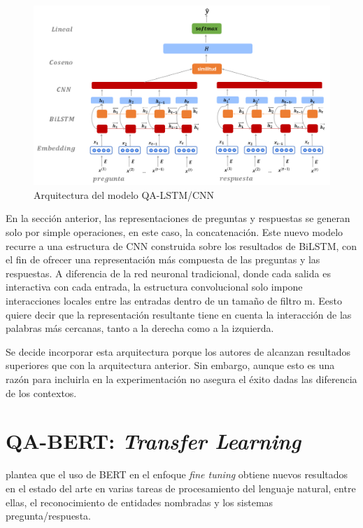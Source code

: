 \begin{figure}[!tb]
  \begin{center}
    \includegraphics[angle=0, width=1\textwidth]{Graphics/lstm_cnn_qa.png}
  \end{center}
    \caption{Arquitectura del modelo QA-LSTM/CNN }\label{lstm_cnn_qa}
\end{figure}

En la sección anterior, las representaciones de preguntas y respuestas se generan solo por simple operaciones, en este caso, la concatenación. Este nuevo modelo recurre a una estructura de CNN construida sobre los resultados de BiLSTM, con el fin de ofrecer una representación más compuesta de las preguntas y las respuestas. A diferencia de la red neuronal tradicional, donde cada salida es interactiva con cada entrada, la estructura convolucional solo impone interacciones locales entre las entradas dentro de un tamaño de filtro m. Eesto quiere decir que la representación resultante tiene en cuenta la interacción de las palabras más cercanas, tanto a la derecha como a la izquierda.

Se decide incorporar esta arquitectura porque los autores de \cite{2015-tan-qalstm} alcanzan resultados superiores que con la arquitectura anterior. Sin embargo, aunque esto es una razón para incluirla en la experimentación no asegura el éxito dadas las diferencia de los contextos.  

\section{QA-BERT: \textit{Transfer Learning}}\label{bert_t}

\cite{2018-devlin-bert} plantea que el uso de BERT en el enfoque \textit{fine tuning} obtiene nuevos resultados en el estado del arte en varias tareas de procesamiento del lenguaje natural, entre ellas, el reconocimiento de entidades nombradas y los sistemas pregunta/respuesta.

